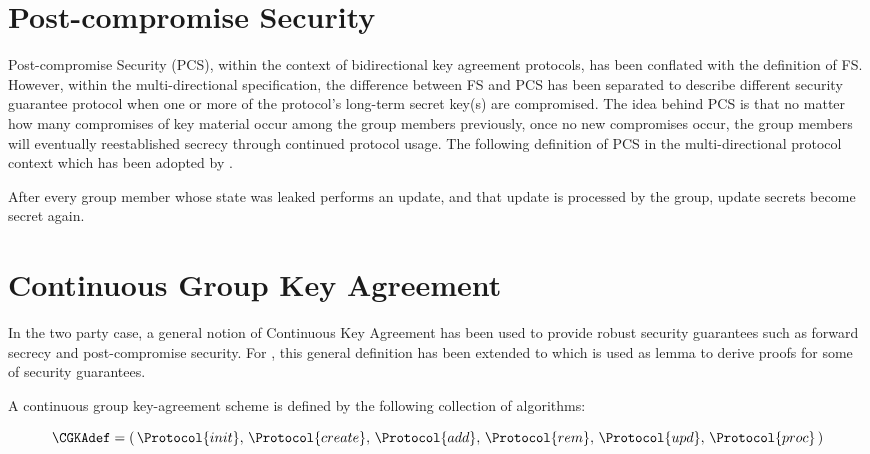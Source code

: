 \hypertarget{post-compromise-security}{%
\section{Post-compromise Security}\label{post-compromise-security}}

Post-compromise Security (PCS), within the context of bidirectional key agreement protocols, has been conflated with the definition of FS.
However, within the multi-directional  specification, the difference between FS and PCS has been separated to describe different security guarantee protocol when one or more of the protocol's long-term secret key(s) are compromised.
The idea behind PCS is that no matter how many compromises of key material occur among the group members previously, once no new compromises occur, the group members will eventually reestablished secrecy through continued protocol usage.
The following definition of PCS in the multi-directional protocol context \autocite{alwen2020security} which has been adopted by .

\begin{definition}
After every group member whose state was leaked performs an update, and that update is processed by the group, update secrets become secret again.
\end{definition}


\hypertarget{sec:CGKA}{%
\section{Continuous Group Key Agreement}\label{sec:CGKA}}

In the two party case, a general notion of Continuous Key Agreement \autocite{alwen2019double} has been used to provide robust security guarantees such as forward secrecy and post-compromise security.
For , this general definition has been extended to  \autocite{alwen2020security} which is used as lemma to derive proofs for some of  security guarantees.

A continuous group key-agreement scheme is defined by the following collection of algorithms:

\[ \CGKAdef = (\,\Protocol{init},\, \Protocol{create},\, \Protocol{add},\, \Protocol{rem},\, \Protocol{upd},\, \Protocol{proc}\,) \]

